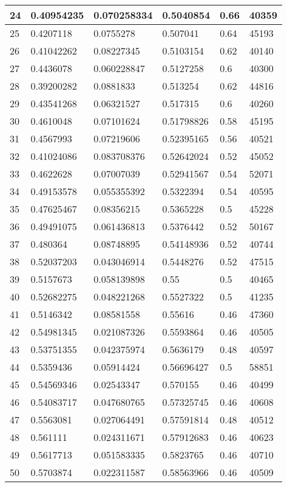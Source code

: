 \begin{longtable}{|l|l|l|l|l|l|}
24 & 0.40954235 & 0.070258334 & 0.5040854 & 0.66 & 40359 \\ \hline 
25 & 0.4207118 & 0.0755278 & 0.507041 & 0.64 & 45193 \\ \hline 
26 & 0.41042262 & 0.08227345 & 0.5103154 & 0.62 & 40140 \\ \hline 
27 & 0.4436078 & 0.060228847 & 0.5127258 & 0.6 & 40300 \\ \hline 
28 & 0.39200282 & 0.0881833 & 0.513254 & 0.62 & 44816 \\ \hline 
29 & 0.43541268 & 0.06321527 & 0.517315 & 0.6 & 40260 \\ \hline 
30 & 0.4610048 & 0.07101624 & 0.51798826 & 0.58 & 45195 \\ \hline 
31 & 0.4567993 & 0.07219606 & 0.52395165 & 0.56 & 40521 \\ \hline 
32 & 0.41024086 & 0.083708376 & 0.52642024 & 0.52 & 45052 \\ \hline 
33 & 0.4622628 & 0.07007039 & 0.52941567 & 0.54 & 52071 \\ \hline 
34 & 0.49153578 & 0.055355392 & 0.5322394 & 0.54 & 40595 \\ \hline 
35 & 0.47625467 & 0.08356215 & 0.5365228 & 0.5 & 45228 \\ \hline 
36 & 0.49491075 & 0.061436813 & 0.5376442 & 0.52 & 50167 \\ \hline 
37 & 0.480364 & 0.08748895 & 0.54148936 & 0.52 & 40744 \\ \hline 
38 & 0.52037203 & 0.043046914 & 0.5448276 & 0.52 & 47515 \\ \hline 
39 & 0.5157673 & 0.058139898 & 0.55 & 0.5 & 40465 \\ \hline 
40 & 0.52682275 & 0.048221268 & 0.5527322 & 0.5 & 41235 \\ \hline 
41 & 0.5146342 & 0.08581558 & 0.55616 & 0.46 & 47360 \\ \hline 
42 & 0.54981345 & 0.021087326 & 0.5593864 & 0.46 & 40505 \\ \hline 
43 & 0.53751355 & 0.042375974 & 0.5636179 & 0.48 & 40597 \\ \hline 
44 & 0.5359436 & 0.05914424 & 0.56696427 & 0.5 & 58851 \\ \hline 
45 & 0.54569346 & 0.02543347 & 0.570155 & 0.46 & 40499 \\ \hline 
46 & 0.54083717 & 0.047680765 & 0.57325745 & 0.46 & 40608 \\ \hline 
47 & 0.5563081 & 0.027064491 & 0.57591814 & 0.48 & 40512 \\ \hline 
48 & 0.561111 & 0.024311671 & 0.57912683 & 0.46 & 40623 \\ \hline 
49 & 0.5617713 & 0.051583335 & 0.5823765 & 0.46 & 40710 \\ \hline 
50 & 0.5703874 & 0.022311587 & 0.58563966 & 0.46 & 40509 \\ \hline 
\end{longtable}